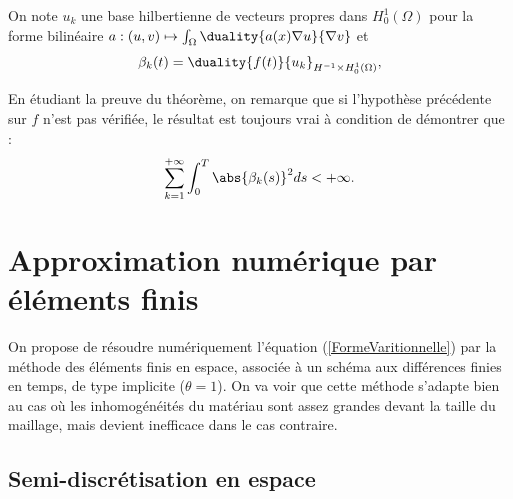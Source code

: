 \documentclass[11pt,a4paper]{article}
\begin{document}
On note $u_k$ une base hilbertienne de vecteurs propres dans $H^1_{0}(\Omega)$ pour la forme bilinéaire $a : (u,v) \mapsto \int_{\Omega} \duality{a(x) \nabla u} {\nabla v}$ et  
\[ \beta_k(t) = \duality{f(t)}{u_k}_{H^{-1}\times H^1_{0}(\Omega)},\]


En étudiant la preuve du théorème, on remarque que si l'hypothèse précédente sur $f$ n'est pas vérifiée, le résultat est toujours vrai à condition de démontrer que :
\[\sum_{k=1}^{+\infty} \int_{0}^T\abs{\beta_k(s)}^2ds < +\infty.\]

\section{Approximation numérique par éléments finis}

On propose de résoudre numériquement l'équation (\ref{FormeVaritionnelle}) par la méthode des éléments finis en espace, associée à un schéma aux différences finies en temps, de type implicite ($\theta = 1$). On va voir que cette méthode s'adapte bien au cas où les inhomogénéités du matériau sont assez grandes devant la taille du maillage, mais devient inefficace dans le cas contraire. 

\subsection{Semi-discrétisation en espace}
\end{document}

